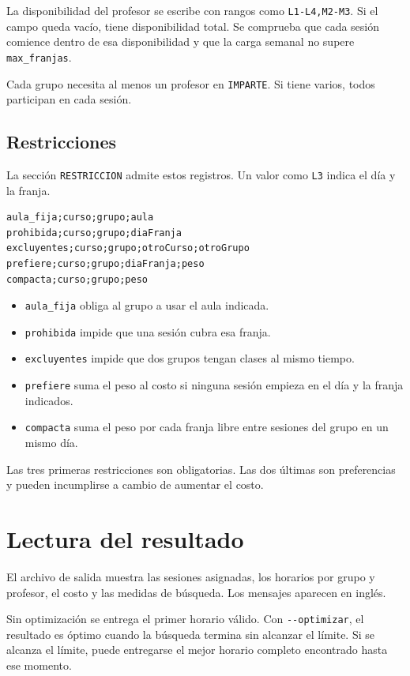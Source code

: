\documentclass[11pt,a4paper]{article}
\newcommand{\clioption}[1]{\texttt{-{}-#1}}
\begin{document}
La disponibilidad del profesor se escribe con rangos como \texttt{L1-L4,M2-M3}. Si el campo queda vacío, tiene disponibilidad total. Se comprueba que cada sesión comience dentro de esa disponibilidad y que la carga semanal no supere \texttt{max\_franjas}.

Cada grupo necesita al menos un profesor en \texttt{IMPARTE}. Si tiene varios, todos participan en cada sesión.

\subsection{Restricciones}

La sección \texttt{RESTRICCION} admite estos registros. Un valor como \texttt{L3} indica el día y la franja.

\begin{lstlisting}
aula_fija;curso;grupo;aula
prohibida;curso;grupo;diaFranja
excluyentes;curso;grupo;otroCurso;otroGrupo
prefiere;curso;grupo;diaFranja;peso
compacta;curso;grupo;peso
\end{lstlisting}

\begin{itemize}
    \item \texttt{aula\_fija} obliga al grupo a usar el aula indicada.
    \item \texttt{prohibida} impide que una sesión cubra esa franja.
    \item \texttt{excluyentes} impide que dos grupos tengan clases al mismo tiempo.
    \item \texttt{prefiere} suma el peso al costo si ninguna sesión empieza en el día y la franja indicados.
    \item \texttt{compacta} suma el peso por cada franja libre entre sesiones del grupo en un mismo día.
\end{itemize}

Las tres primeras restricciones son obligatorias. Las dos últimas son preferencias y pueden incumplirse a cambio de aumentar el costo.

\section{Lectura del resultado}

El archivo de salida muestra las sesiones asignadas, los horarios por grupo y profesor, el costo y las medidas de búsqueda. Los mensajes aparecen en inglés.

Sin optimización se entrega el primer horario válido. Con \clioption{optimizar}, el resultado es óptimo cuando la búsqueda termina sin alcanzar el límite. Si se alcanza el límite, puede entregarse el mejor horario completo encontrado hasta ese momento.
\end{document}
